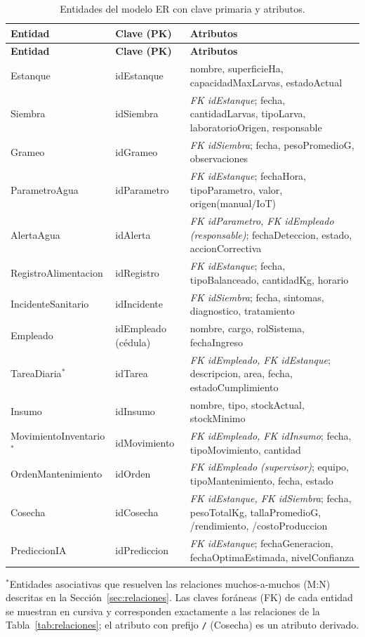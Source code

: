 \documentclass[11pt,a4paper]{report}
\begin{document}
{\footnotesize
\begin{longtable}{L{3.0cm}L{1.8cm}L{8.8cm}}
\caption{Entidades del modelo ER con clave primaria y atributos.}\label{tab:entidades}\\
\toprule
\textbf{Entidad} & \textbf{Clave (PK)} & \textbf{Atributos} \\
\midrule
\endfirsthead
\toprule
\textbf{Entidad} & \textbf{Clave (PK)} & \textbf{Atributos} \\
\midrule
\endhead
\bottomrule
\endfoot
Estanque & idEstanque & nombre, superficieHa, capacidadMaxLarvas, estadoActual \\
Siembra & idSiembra & \textit{FK idEstanque}; fecha, cantidadLarvas, tipoLarva, laboratorioOrigen, responsable \\
Grameo & idGrameo & \textit{FK idSiembra}; fecha, pesoPromedioG, observaciones \\
ParametroAgua & idParametro & \textit{FK idEstanque}; fechaHora, tipoParametro, valor, origen(manual/IoT) \\
AlertaAgua & idAlerta & \textit{FK idParametro, FK idEmpleado (responsable)}; fechaDeteccion, estado, accionCorrectiva \\
RegistroAlimentacion & idRegistro & \textit{FK idEstanque}; fecha, tipoBalanceado, cantidadKg, horario \\
IncidenteSanitario & idIncidente & \textit{FK idSiembra}; fecha, sintomas, diagnostico, tratamiento \\
Empleado & idEmpleado (c\'edula) & nombre, cargo, rolSistema, fechaIngreso \\
TareaDiaria$^{*}$ & idTarea & \textit{FK idEmpleado, FK idEstanque}; descripcion, area, fecha, estadoCumplimiento \\
Insumo & idInsumo & nombre, tipo, stockActual, stockMinimo \\
MovimientoInventario$^{*}$ & idMovimiento & \textit{FK idEmpleado, FK idInsumo}; fecha, tipoMovimiento, cantidad \\
OrdenMantenimiento & idOrden & \textit{FK idEmpleado (supervisor)}; equipo, tipoMantenimiento, fecha, estado \\
Cosecha & idCosecha & \textit{FK idEstanque, FK idSiembra}; fecha, pesoTotalKg, tallaPromedioG, /rendimiento, /costoProduccion \\
PrediccionIA & idPrediccion & \textit{FK idEstanque}; fechaGeneracion, fechaOptimaEstimada, nivelConfianza \\
\end{longtable}
}
\noindent $^{*}$Entidades asociativas que resuelven las relaciones muchos-a-muchos (M:N) descritas en la Secci\'on~\ref{sec:relaciones}. Las claves for\'aneas (FK) de cada entidad se muestran en cursiva y corresponden exactamente a las relaciones de la Tabla~\ref{tab:relaciones}; el atributo con prefijo \texttt{/} (Cosecha) es un atributo derivado.
\end{document}
